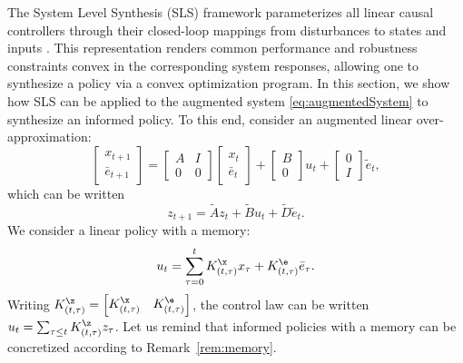 \documentclass[letterpaper, 10 pt, conference]{ieeeconf}  %
\begin{document}
The System Level Synthesis (SLS) framework parameterizes all linear causal controllers through their closed-loop mappings from disturbances to states and inputs \cite{anderson2019system}. This representation renders common performance and robustness constraints convex in the corresponding system responses, allowing one to synthesize a policy via a convex optimization program.
In this section, we show how SLS can be applied to the augmented system \eqref{eq:augmentedSystem} to synthesize an informed policy. To this end, consider an augmented linear over-approximation:
$$
\begin{bmatrix}
x_{t+1}\\ \bar{e}_{t+1}
\end{bmatrix} =\begin{bmatrix}A & I \\0 & 0\end{bmatrix}\begin{bmatrix}
x_{t}\\ \bar{e}_{t}
\end{bmatrix} +
\begin{bmatrix}
B \\ 0
\end{bmatrix} u_t +
\begin{bmatrix}
0\\I
\end{bmatrix}\tilde{e}_t,
$$
which can be written
\begin{equation}\label{eq:sls:augmentedSystem}
z_{t+1}=\tilde{A}z_t+\tilde{B}u_t+\tilde{D}\tilde{e}_t.
\end{equation}
We consider a linear policy with a memory:
\begin{equation}\label{eq:linearPolicyMemory}
u_t = \sum_{\tau=0}^t K_{(t,\tau)}^\x x_\tau + K_{(t,\tau)}^\e \bar{e}_\tau.
\end{equation}
Writing $K^\z_{(t,\tau)}=\begin{bmatrix}K_{(t,\tau)}^\x & K_{(t,\tau)}^\e\end{bmatrix}$, the control law can be written $u_t=\sum_{\tau\leq t}K^\z_{(t,\tau)}z_\tau$. Let us remind that informed policies with a memory can be concretized according to Remark~\ref{rem:memory}.
\end{document}
